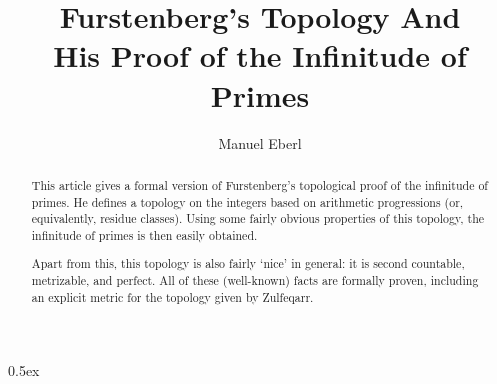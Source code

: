 \documentclass[11pt,a4paper]{article}
\begin{document}
\title{Furstenberg's Topology And\\ His Proof of the Infinitude of Primes}
\author{Manuel Eberl}
\maketitle

\begin{abstract}
This article gives a formal version of Furstenberg's topological proof of the infinitude of
primes. He defines a topology on the integers based on arithmetic progressions (or, equivalently, residue classes).
Using some fairly obvious properties of this topology, the infinitude of primes is then easily obtained.

Apart from this, this topology is also fairly `nice' in general: it is second countable, metrizable, and perfect. All of these (well-known)
facts are formally proven, including an explicit metric for the topology given by Zulfeqarr.
\end{abstract}

\tableofcontents
\newpage
\parindent 0pt\parskip 0.5ex





\end{document}
